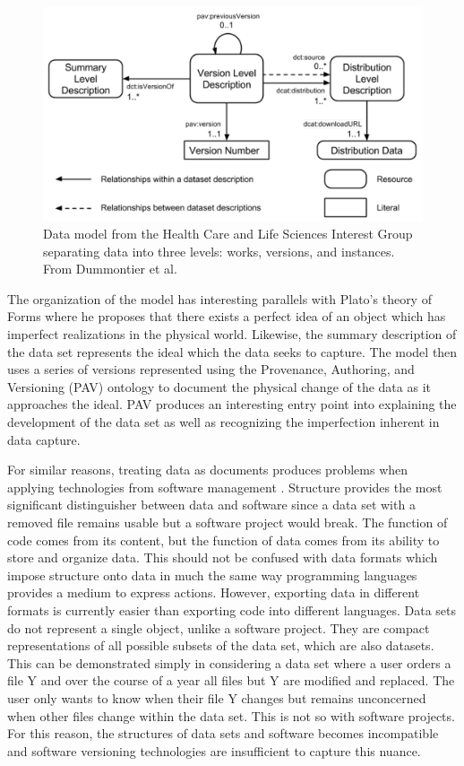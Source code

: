 \begin{figure}%
	\centering
	\includegraphics[scale=0.35]{figures/HCLSModel.png}
	\caption{Data model from the Health Care and Life Sciences Interest Group separating data into three levels: works, versions, and instances.  From Dummontier et al. \cite{Dummontier2016}}
	\label{HCLSModel}
\end{figure}

The organization of the model has interesting parallels with Plato's theory of Forms where he proposes that there exists a perfect idea of an object which has imperfect realizations in the physical world.
Likewise, the summary description of the data set represents the ideal which the data seeks to capture.
The model then uses a series of versions represented using the Provenance, Authoring, and Versioning (PAV) ontology to document the physical change of the data as it approaches the ideal\cite{Ciccarese2013}.
PAV produces an interesting entry point into explaining the development of the data set as well as recognizing the imperfection inherent in data capture.

For similar reasons, treating data as documents produces problems when applying technologies from software management \cite{tichy1985rcs}\cite{Chien:2000:VMX:646544.696357}.
Structure provides the most significant distinguisher between data and software since a data set with a removed file remains usable but a software project would break.
The function of code comes from its content, but the function of data comes from its ability to store and organize data.
This should not be confused with data formats which impose structure onto data in much the same way programming languages provides a medium to express actions.
However, exporting data in different formats is currently easier than exporting code into different languages.
Data sets do not represent a single object, unlike a software project\cite{Chacon:2009:PG:1618548}.
They are compact representations of all possible subsets of the data set, which are also datasets.
This can be demonstrated simply in considering a data set where a user orders a file Y and over the course of a year all files but Y are modified and replaced.
The user only wants to know when their file Y changes but remains unconcerned when other files change within the data set.
This is not so with software projects.
For this reason, the structures of data sets and software becomes incompatible and software versioning technologies are insufficient to capture this nuance.

